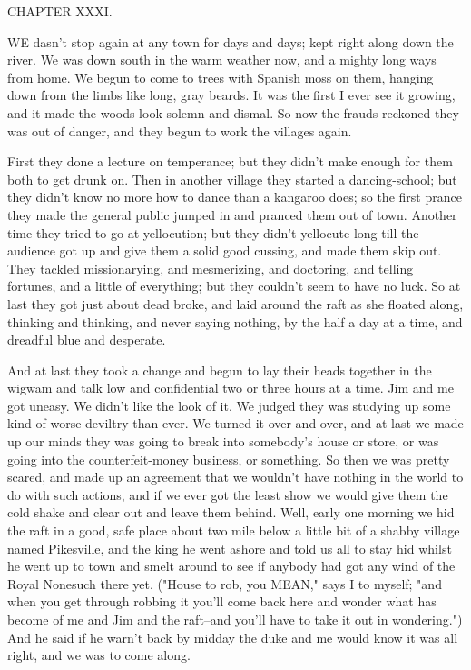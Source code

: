 CHAPTER XXXI.

WE dasn't stop again at any town for days and days; kept right along down
the river.  We was down south in the warm weather now, and a mighty long
ways from home.  We begun to come to trees with Spanish moss on them,
hanging down from the limbs like long, gray beards.  It was the first I
ever see it growing, and it made the woods look solemn and dismal.  So
now the frauds reckoned they was out of danger, and they begun to work
the villages again.

First they done a lecture on temperance; but they didn't make enough for
them both to get drunk on.  Then in another village they started a
dancing-school; but they didn't know no more how to dance than a kangaroo
does; so the first prance they made the general public jumped in and
pranced them out of town.  Another time they tried to go at yellocution;
but they didn't yellocute long till the audience got up and give them a
solid good cussing, and made them skip out.  They tackled missionarying,
and mesmerizing, and doctoring, and telling fortunes, and a little of
everything; but they couldn't seem to have no luck.  So at last they got
just about dead broke, and laid around the raft as she floated along,
thinking and thinking, and never saying nothing, by the half a day at a
time, and dreadful blue and desperate.

And at last they took a change and begun to lay their heads together in
the wigwam and talk low and confidential two or three hours at a time.
Jim and me got uneasy.  We didn't like the look of it.  We judged they
was studying up some kind of worse deviltry than ever.  We turned it over
and over, and at last we made up our minds they was going to break into
somebody's house or store, or was going into the counterfeit-money
business, or something. So then we was pretty scared, and made up an
agreement that we wouldn't have nothing in the world to do with such
actions, and if we ever got the least show we would give them the cold
shake and clear out and leave them behind. Well, early one morning we hid
the raft in a good, safe place about two mile below a little bit of a
shabby village named Pikesville, and the king he went ashore and told us
all to stay hid whilst he went up to town and smelt around to see if
anybody had got any wind of the Royal Nonesuch there yet. ("House to rob,
you MEAN," says I to myself; "and when you get through robbing it you'll
come back here and wonder what has become of me and Jim and the raft--and
you'll have to take it out in wondering.") And he said if he warn't back
by midday the duke and me would know it was all right, and we was to come
along.

